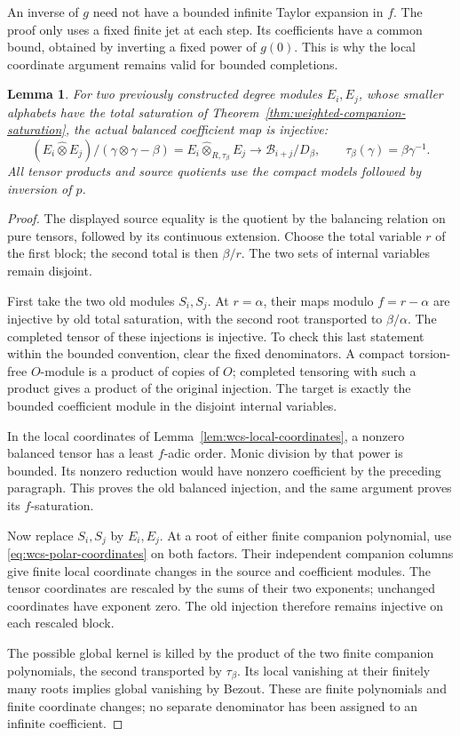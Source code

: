 \documentclass[11pt]{article}
\newtheorem{lemma}[theorem]{Lemma}
\theoremstyle{definition}\newtheorem{definition}[theorem]{Definition}
\begin{document}
An inverse of \(g\) need not have a bounded infinite Taylor
expansion in \(f\).  The proof only uses a fixed finite jet at
each step.  Its coefficients have a common bound, obtained by
inverting a fixed power of \(g(0)\).  This is why the local
coordinate argument remains valid for bounded completions.

\begin{lemma}\label{lem:wcs-balanced}
For two previously constructed degree modules \(E_i,E_j\),
whose smaller alphabets have the total saturation of
Theorem~\ref{thm:weighted-companion-saturation}, the actual
balanced coefficient map is injective:
\[
 (E_i\widehat\otimes E_j)/(\gamma\otimes\gamma-\beta)
   =E_i\widehat\otimes_{R,\tau_\beta}E_j
       \longrightarrow \mathcal B_{i+j}/D_\beta,
 \qquad \tau_\beta(\gamma)=\beta\gamma^{-1}.
\]
All tensor products and source quotients use the compact
models followed by inversion of \(p\).
\end{lemma}

\begin{proof}
The displayed source equality is the quotient by the balancing
relation on pure tensors, followed by its continuous extension.
Choose the total variable \(r\) of the first block; the second
total is then \(\beta/r\).  The two sets of internal variables
remain disjoint.

First take the two old modules \(S_i,S_j\).  At \(r=\alpha\),
their maps modulo \(f=r-\alpha\) are injective by old total
saturation, with the second root transported to \(\beta/\alpha\).
The completed tensor of these injections is injective.
To check this last statement within the bounded convention,
clear the fixed denominators.  A compact torsion-free
\(O\)-module is a product of copies of \(O\); completed tensoring
with such a product gives a product of the original injection.
The target is exactly the bounded coefficient module in the
disjoint internal variables.

In the local coordinates of Lemma~\ref{lem:wcs-local-coordinates},
a nonzero balanced tensor has a least \(f\)-adic order.
Monic division by that power is bounded.  Its nonzero reduction
would have nonzero coefficient by the preceding paragraph.
This proves the old balanced injection, and the same argument
proves its \(f\)-saturation.

Now replace \(S_i,S_j\) by \(E_i,E_j\).  At a root of either
finite companion polynomial, use
\eqref{eq:wcs-polar-coordinates} on both factors.  Their
independent companion columns give finite local coordinate
changes in the source and coefficient modules.  The tensor
coordinates are rescaled by the sums of their two exponents;
unchanged coordinates have exponent zero.  The old injection
therefore remains injective on each rescaled block.

The possible global kernel is killed by the product of the
two finite companion polynomials, the second transported by
\(\tau_\beta\).  Its local vanishing at their finitely many
roots implies global vanishing by Bezout.  These are finite
polynomials and finite coordinate changes; no separate
denominator has been assigned to an infinite coefficient.
\end{proof}
\end{document}
